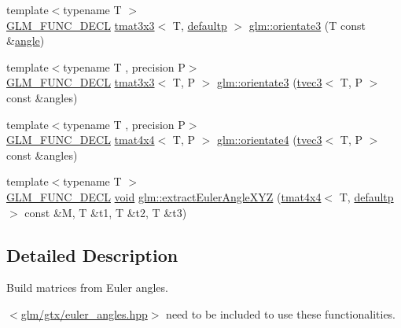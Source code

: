 \begin{DoxyCompactItemize}
\item 
{\footnotesize template$<$typename T $>$ }\\\mbox{\hyperlink{setup_8hpp_ab2d052de21a70539923e9bcbf6e83a51}{G\+L\+M\+\_\+\+F\+U\+N\+C\+\_\+\+D\+E\+CL}} \mbox{\hyperlink{structglm_1_1tmat3x3}{tmat3x3}}$<$ T, \mbox{\hyperlink{namespaceglm_a0f04f086094c747d227af4425893f545a9d21ccd8b5a009ec7eb7677befc3bf51}{defaultp}} $>$ \mbox{\hyperlink{group__gtx__euler__angles_gab188e2526dea3c003e86e298f618085e}{glm\+::orientate3}} (T const \&\mbox{\hyperlink{group__gtc__quaternion_gad4a4448baedb198b2b1e7880d2544dc9}{angle}})
\item 
{\footnotesize template$<$typename T , precision P$>$ }\\\mbox{\hyperlink{setup_8hpp_ab2d052de21a70539923e9bcbf6e83a51}{G\+L\+M\+\_\+\+F\+U\+N\+C\+\_\+\+D\+E\+CL}} \mbox{\hyperlink{structglm_1_1tmat3x3}{tmat3x3}}$<$ T, P $>$ \mbox{\hyperlink{group__gtx__euler__angles_ga33f0d790cecd8337ee83f8e3a8109b11}{glm\+::orientate3}} (\mbox{\hyperlink{structglm_1_1tvec3}{tvec3}}$<$ T, P $>$ const \&angles)
\item 
{\footnotesize template$<$typename T , precision P$>$ }\\\mbox{\hyperlink{setup_8hpp_ab2d052de21a70539923e9bcbf6e83a51}{G\+L\+M\+\_\+\+F\+U\+N\+C\+\_\+\+D\+E\+CL}} \mbox{\hyperlink{structglm_1_1tmat4x4}{tmat4x4}}$<$ T, P $>$ \mbox{\hyperlink{group__gtx__euler__angles_ga4e25c9468b6f002c76e9a2412bcfa503}{glm\+::orientate4}} (\mbox{\hyperlink{structglm_1_1tvec3}{tvec3}}$<$ T, P $>$ const \&angles)
\item 
{\footnotesize template$<$typename T $>$ }\\\mbox{\hyperlink{setup_8hpp_ab2d052de21a70539923e9bcbf6e83a51}{G\+L\+M\+\_\+\+F\+U\+N\+C\+\_\+\+D\+E\+CL}} \mbox{\hyperlink{glad_8h_a950fc91edb4504f62f1c577bf4727c29}{void}} \mbox{\hyperlink{group__gtx__euler__angles_gad5838a4c87ce2b8ee4c4e17bd162fd14}{glm\+::extract\+Euler\+Angle\+X\+YZ}} (\mbox{\hyperlink{structglm_1_1tmat4x4}{tmat4x4}}$<$ T, \mbox{\hyperlink{namespaceglm_a0f04f086094c747d227af4425893f545a9d21ccd8b5a009ec7eb7677befc3bf51}{defaultp}} $>$ const \&M, T \&t1, T \&t2, T \&t3)
\end{DoxyCompactItemize}


\subsection{Detailed Description}
Build matrices from Euler angles. 

$<$\mbox{\hyperlink{euler__angles_8hpp}{glm/gtx/euler\+\_\+angles.\+hpp}}$>$ need to be included to use these functionalities. 

